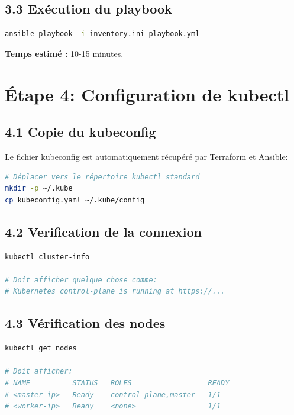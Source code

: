 \documentclass[12pt,a4paper,twoside]{report}
\begin{document}
\subsection{3.3 Exécution du playbook}

\begin{lstlisting}[language=bash]
ansible-playbook -i inventory.ini playbook.yml
\end{lstlisting}

\textbf{Temps estimé :} 10-15 minutes.

\section{Étape 4: Configuration de kubectl}

\subsection{4.1 Copie du kubeconfig}

Le fichier kubeconfig est automatiquement récupéré par Terraform et Ansible:

\begin{lstlisting}[language=bash]
# Déplacer vers le répertoire kubectl standard
mkdir -p ~/.kube
cp kubeconfig.yaml ~/.kube/config
\end{lstlisting}

\subsection{4.2 Verification de la connexion}

\begin{lstlisting}[language=bash]
kubectl cluster-info

# Doit afficher quelque chose comme:
# Kubernetes control-plane is running at https://...
\end{lstlisting}

\subsection{4.3 Vérification des nodes}

\begin{lstlisting}[language=bash]
kubectl get nodes

# Doit afficher:
# NAME          STATUS   ROLES                  READY
# <master-ip>   Ready    control-plane,master   1/1
# <worker-ip>   Ready    <none>                 1/1
\end{lstlisting}
\end{document}
